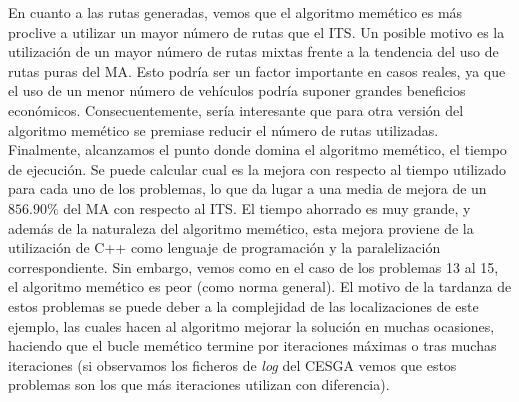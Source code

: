 En cuanto a las rutas generadas, vemos que el algoritmo memético es más proclive a utilizar un mayor número de rutas que el ITS. Un posible motivo es la utilización de un mayor número de rutas mixtas frente a la tendencia del uso de rutas puras del MA. Esto podría ser un factor importante en casos reales, ya que el uso de un menor número de vehículos podría suponer grandes beneficios económicos. Consecuentemente, sería interesante que para otra versión del algoritmo memético se premiase reducir el número de rutas utilizadas.\\

Finalmente, alcanzamos el punto donde domina el algoritmo memético, el tiempo de ejecución. Se puede calcular cual es la mejora con respecto al tiempo utilizado para cada uno de los problemas, lo que da lugar a una media de mejora de un $856.90\%$ del MA con respecto al ITS. El tiempo ahorrado es muy grande, y además de la naturaleza del algoritmo memético, esta mejora proviene de la utilización de C++ como lenguaje de programación y la paralelización correspondiente. Sin embargo, vemos como en el caso de los problemas 13 al 15, el algoritmo memético es peor (como norma general). El motivo de la tardanza de estos problemas se puede deber a la complejidad de las localizaciones de este ejemplo, las cuales hacen al algoritmo mejorar la solución en muchas ocasiones, haciendo que el bucle memético termine por iteraciones máximas o tras muchas iteraciones (si observamos los ficheros de \textit{log} del CESGA vemos que estos problemas son los que más iteraciones utilizan con diferencia).\\

